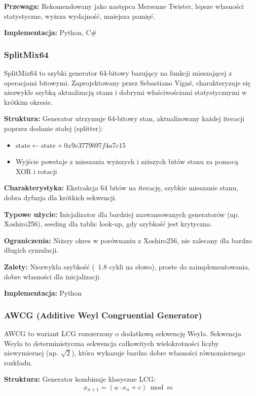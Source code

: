 \documentclass[12pt,a4paper]{article}
\begin{document}
\textbf{Przewaga:} Rekomendowany jako następca Mersenne Twister, lepsze własności statystyczne, wyższa wydajność, mniejsza pamięć.

\textbf{Implementacja:} Python, C\#

\subsubsection{SplitMix64}

SplitMix64 to szybki generator 64-bitowy bazujący na funkcji mieszającej z operacjami bitowymi. Zaprojektowany przez Sebastiano Vigné, charakteryzuje się niezwykle szybką aktualizacją stanu i dobrymi właściwościami statystycznymi w krótkim okresie.

\textbf{Struktura:} Generator utrzymuje 64-bitowy stan, aktualizowany każdej iteracji poprzez dodanie stałej (splitter):
\begin{itemize}
    \item $\text{state} \leftarrow \text{state} + 0x9e3779b97f4a7c15$
    \item Wyjście powstaje z mieszania wyższych i niższych bitów stanu za pomocą XOR i rotacji
\end{itemize}

\textbf{Charakterystyka:} Ekstrakcja 64 bitów na iterację, szybkie mieszanie stanu, dobra dyfuzja dla krótkich sekwencji.

\textbf{Typowe użycie:} Inicjalizator dla bardziej zaawansowanych generatorów (np. Xoshiro256), seeding dla tablic look-up, gdy szybkość jest krytyczna.

\textbf{Ograniczenia:} Niższy okres w porównaniu z Xoshiro256, nie zalecany dla bardzo długich symulacji.

\textbf{Zalety:} Niezwykła szybkość (~1.8 cykli na słowo), proste do zaimplementowania, dobre własności dla inicjalizacji.

\textbf{Implementacja:} Python

\subsubsection{AWCG (Additive Weyl Congruential Generator)}

AWCG to wariant LCG rozszerzony o dodatkową sekwencję Weyla. Sekwencja Weyla to deterministyczna sekwencja całkowitych wielokrotności liczby niewymiernej (np. $\sqrt{2}$), która wykazuje bardzo dobre własności równomiernego rozkładu.

\textbf{Struktura:} Generator kombinuje klasyczne LCG:
$$x_{n+1} = (a \cdot x_n + c) \bmod m$$
\end{document}
